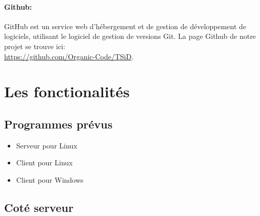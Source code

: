 \documentclass[12pt,a4paper,twoside]{article}
\begin{document}
    \paragraph*{Github:\\}
    GitHub est un service web d'hébergement et de gestion de développement de logiciels, utilisant le logiciel de gestion de versions Git. La page Github de notre projet se trouve ici:\\ \hyperref[]{https://github.com/Organic-Code/TSiD}.

    \section{Les fonctionalités}

    \subsection*{Programmes prévus}

    \begin{itemize}
        \item{} Serveur pour Linux
        \item{} Client pour Linux
        \item{} Client pour Windows
    \end{itemize}

    \subsection*{Coté serveur}
\end{document}
